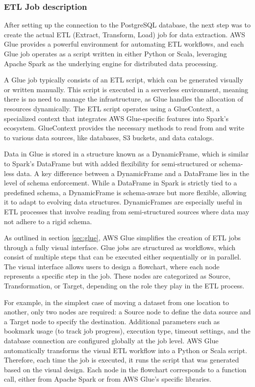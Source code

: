 \subsubsection{ETL Job description}
\label{sec:gluejobdesc}
After setting up the connection to the PostgreSQL database, the next step was to create the actual ETL (Extract, Transform, Load) job for data extraction. AWS Glue provides a powerful environment for automating ETL workflows, and each Glue job operates as a script written in either Python or Scala, leveraging Apache Spark as the underlying engine for distributed data processing.

A Glue job typically consists of an ETL script, which can be generated visually or written manually. This script is executed in a serverless environment, meaning there is no need to manage the infrastructure, as Glue handles the allocation of resources dynamically. The ETL script operates using a GlueContext, a specialized context that integrates AWS Glue-specific features into Spark’s ecosystem. GlueContext provides the necessary methods to read from and write to various data sources, like databases, S3 buckets, and data catalogs.

Data in Glue is stored in a structure known as a DynamicFrame, which is similar to Spark’s DataFrame but with added flexibility for semi-structured or schema-less data. A key difference between a DynamicFrame and a DataFrame lies in the level of schema enforcement. While a DataFrame in Spark is strictly tied to a predefined schema, a DynamicFrame is schema-aware but more flexible, allowing it to adapt to evolving data structures. DynamicFrames are especially useful in ETL processes that involve reading from semi-structured sources where data may not adhere to a rigid schema.

As outlined in section \ref{sec:glue}, AWS Glue simplifies the creation of ETL jobs through a fully visual interface. Glue jobs are structured as workflows, which consist of multiple steps that can be executed either sequentially or in parallel. The visual interface allows users to design a flowchart, where each node represents a specific step in the job. These nodes are categorized as Source, Transformation, or Target, depending on the role they play in the ETL process.

For example, in the simplest case of moving a dataset from one location to another, only two nodes are required: a Source node to define the data source and a Target node to specify the destination. Additional parameters such as bookmark usage (to track job progress), execution type, timeout settings, and the database connection are configured globally at the job level. AWS Glue automatically transforms the visual ETL workflow into a Python or Scala script. Therefore, each time the job is executed, it runs the script that was generated based on the visual design. Each node in the flowchart corresponds to a function call, either from Apache Spark or from AWS Glue’s specific libraries.

